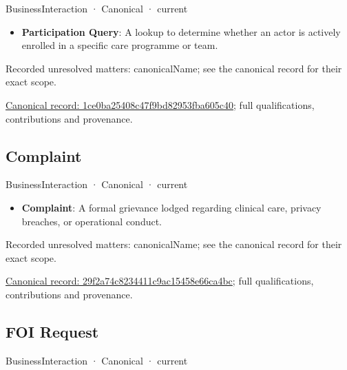 \label{element:1ce0ba25408c47f9bd82953fba605c40}
{\small BusinessInteraction · Canonical · current}\par

\begin{itemize}


\item \textbf{Participation Query}: A lookup to determine whether an actor is actively enrolled in a specific care programme or team.

\end{itemize}

{\small Recorded unresolved matters: canonicalName; see the canonical record for their exact scope.}\par
{\footnotesize \href{../../../../continuum/business/business-interaction/1ce0ba25408c47f9bd82953fba605c40.md}{Canonical record: 1ce0ba25408c47f9bd82953fba605c40}; full qualifications, contributions and provenance.}\par
\subsection{Complaint}

\label{element:29f2a74c8234411c9ac15458e66ca4bc}
{\small BusinessInteraction · Canonical · current}\par

\begin{itemize}


\item \textbf{Complaint}: A formal grievance lodged regarding clinical care, privacy breaches, or operational conduct.

\end{itemize}

{\small Recorded unresolved matters: canonicalName; see the canonical record for their exact scope.}\par
{\footnotesize \href{../../../../continuum/business/business-interaction/29f2a74c8234411c9ac15458e66ca4bc.md}{Canonical record: 29f2a74c8234411c9ac15458e66ca4bc}; full qualifications, contributions and provenance.}\par
\subsection{FOI Request}

\label{element:2c7ca48559fb4a72b4d9c250df4015ce}
{\small BusinessInteraction · Canonical · current}\par

